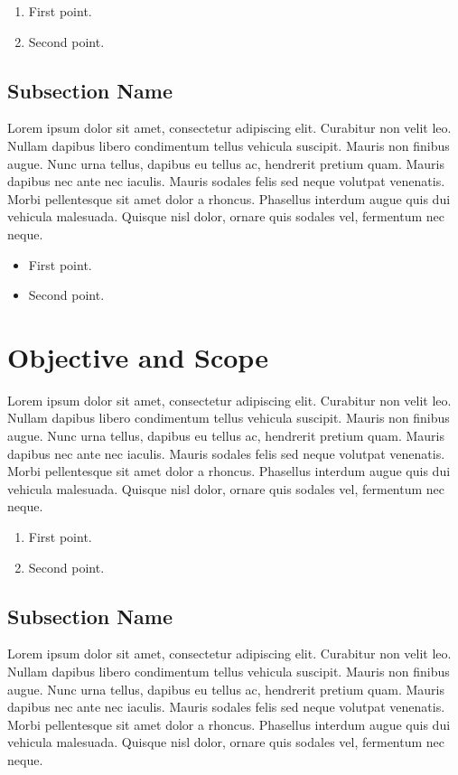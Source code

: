 \documentclass[12pt,a4paper]{report}
\begin{document}
\begin{enumerate}
\item First point.
\item Second point.
\end{enumerate}

\subsection{Subsection Name}
Lorem ipsum dolor sit amet, consectetur adipiscing elit. Curabitur non velit leo. Nullam dapibus libero condimentum tellus vehicula suscipit. Mauris non finibus augue. Nunc urna tellus, dapibus eu tellus ac, hendrerit pretium quam. Mauris dapibus nec ante nec iaculis. Mauris sodales felis sed neque volutpat venenatis. Morbi pellentesque sit amet dolor a rhoncus. Phasellus interdum augue quis dui vehicula malesuada. Quisque nisl dolor, ornare quis sodales vel, fermentum nec neque. 

\begin{itemize}
\item First point.
\item Second point.
\end{itemize}

\section{Objective and Scope}
Lorem ipsum dolor sit amet, consectetur adipiscing elit. Curabitur non velit leo. Nullam dapibus libero condimentum tellus vehicula suscipit. Mauris non finibus augue. Nunc urna tellus, dapibus eu tellus ac, hendrerit pretium quam. Mauris dapibus nec ante nec iaculis. Mauris sodales felis sed neque volutpat venenatis. Morbi pellentesque sit amet dolor a rhoncus. Phasellus interdum augue quis dui vehicula malesuada. Quisque nisl dolor, ornare quis sodales vel, fermentum nec neque. 

\begin{enumerate}
\item First point.
\item Second point.
\end{enumerate}

\subsection{Subsection Name}
Lorem ipsum dolor sit amet, consectetur adipiscing elit. Curabitur non velit leo. Nullam dapibus libero condimentum tellus vehicula suscipit. Mauris non finibus augue. Nunc urna tellus, dapibus eu tellus ac, hendrerit pretium quam. Mauris dapibus nec ante nec iaculis. Mauris sodales felis sed neque volutpat venenatis. Morbi pellentesque sit amet dolor a rhoncus. Phasellus interdum augue quis dui vehicula malesuada. Quisque nisl dolor, ornare quis sodales vel, fermentum nec neque. 
\end{document}
